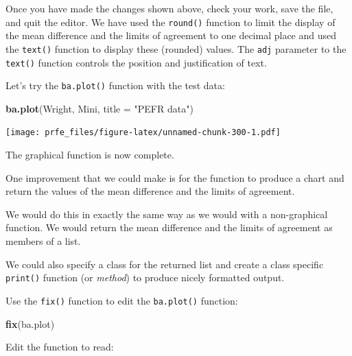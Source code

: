 \documentclass[12pt,]{book}
\newenvironment{Shaded}{\begin{snugshade}}{\end{snugshade}}
\newcommand{\KeywordTok}[1]{\textcolor[rgb]{0.13,0.29,0.53}{\textbf{#1}}}
\newcommand{\DataTypeTok}[1]{\textcolor[rgb]{0.13,0.29,0.53}{#1}}
\newcommand{\StringTok}[1]{\textcolor[rgb]{0.31,0.60,0.02}{#1}}
\newcommand{\NormalTok}[1]{#1}
\theoremstyle{definition}
\theoremstyle{definition}
\theoremstyle{definition}
\theoremstyle{remark}
\begin{document}
Once you have made the changes shown above, check your work, save the
file, and quit the editor. We have used the \texttt{round()} function to
limit the display of the mean difference and the limits of agreement to
one decimal place and used the \texttt{text()} function to display these
(rounded) values. The \texttt{adj} parameter to the \texttt{text()}
function controls the position and justification of text.

Let's try the \texttt{ba.plot()} function with the test data:

\begin{Shaded}
\begin{Highlighting}[]
\KeywordTok{ba.plot}\NormalTok{(Wright, Mini, }\DataTypeTok{title =} \StringTok{"PEFR data"}\NormalTok{)}
\end{Highlighting}
\end{Shaded}

\texttt{[image: prfe\_files/figure-latex/unnamed-chunk-300-1.pdf]}

The graphical function is now complete.

One improvement that we could make is for the function to produce a
chart and return the values of the mean difference and the limits of
agreement.

We would do this in exactly the same way as we would with a
non-graphical function. We would return the mean difference and the
limits of agreement as members of a list.

We could also specify a class for the returned list and create a class
specific \texttt{print()} function (or \emph{method}) to produce nicely
formatted output.

Use the \texttt{fix()} function to edit the \texttt{ba.plot()} function:

\begin{Shaded}
\begin{Highlighting}[]
\KeywordTok{fix}\NormalTok{(ba.plot)}
\end{Highlighting}
\end{Shaded}

Edit the function to read:
\end{document}
